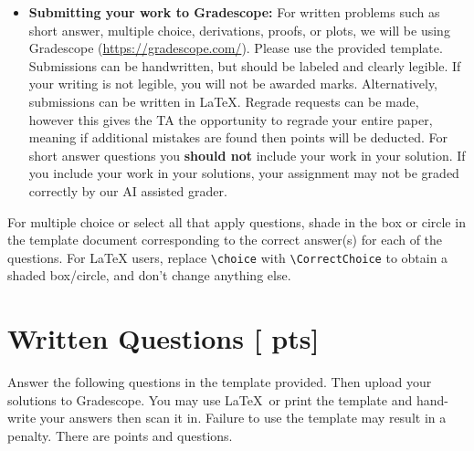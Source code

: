 \documentclass[11pt,addpoints,answers]{exam}
\numberwithin{equation}{section} %
\numberwithin{figure}{section} %
\numberwithin{table}{section} %
\newcommand{\pts}[1]{\textbf{[#1 pts]}}
\begin{document}
\begin{itemize}
\item \textbf{Submitting your work to Gradescope:} For written problems such as short answer, multiple choice, derivations, proofs, or plots, we will be using Gradescope (\url{https://gradescope.com/}). Please use the provided template. Submissions can be handwritten, but should be labeled and clearly legible. If your writing is not legible, you will not be awarded marks. Alternatively, submissions can be written in LaTeX. Regrade requests can be made, however this gives the TA the opportunity to regrade your entire paper, meaning if additional mistakes are found then points will be deducted. For short answer questions you \textbf{should not} include your work in your solution.  If you include your work in your solutions, your assignment may not be graded correctly by our AI assisted grader. 



\end{itemize}


For multiple choice or select all that apply questions, shade in the box or circle in the template document corresponding to the correct answer(s) for each of the questions. For \LaTeX{} users, replace \lstinline{\choice} with \lstinline{\CorrectChoice} to obtain a shaded box/circle, and don't change anything else.


\clearpage

\section{Written Questions \pts{\numpoints{}}}
\label{sec:warmup}
Answer the following questions in the template provided.  Then upload your solutions to Gradescope. You may use \LaTeX\ or print the template and hand-write your answers then scan it in. Failure to use the template may result in a penalty. There are \numpoints{} points and \numquestions{} questions.
\end{document}
